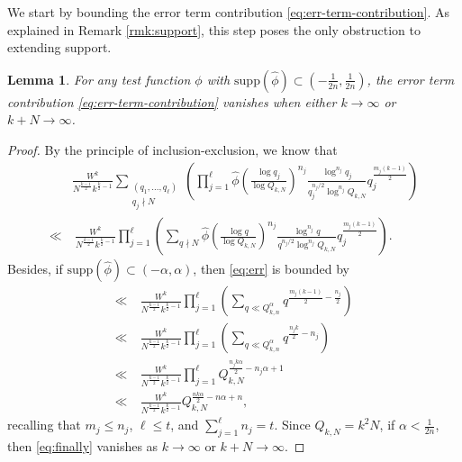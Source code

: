 \documentclass[12pt, reqno,oneside]{amsart}
\theoremstyle{plain}
\newtheorem{lemma}[theorem]{Lemma}
\theoremstyle{definition}
\theoremstyle{remark}
\theoremstyle{plain}
\numberwithin{equation}{section}
\begin{document}
We start by bounding the error term contribution \eqref{eq:err-term-contribution}. As explained in Remark \ref{rmk:support}, this step poses the only obstruction to extending support.

\begin{lemma}\label{lemma:error-term-analysis}
For any test function $\phi$ with $\text{supp}(\widehat{\phi})\subset\left(-\frac{1}{2n},\frac{1}{2n}\right)$, the error term contribution \eqref{eq:err-term-contribution} vanishes when either $k\to\infty$ or $k+N\to\infty$.
\end{lemma}
\begin{proof}
By the principle of inclusion-exclusion, we know that 
\begin{align}
\nonumber
&\frac{W^k}{N^{\frac{k-1}{2}}k^{\frac{k}{2}-1}}\sum_{\substack{(q_1,\dots,q_\ell) \\ q_j\nmid N}}\left(\prod_{j=1}^\ell\widehat{\phi}\left(\frac{\log q_j}{\log Q_{k,N}}\right)^{n_j}\frac{\log^{n_j} q_j}{q_j^{n_j/2}\log^{n_j} Q_{k,N}} q_j^{\frac{m_j(k-1)}{2}}\right) \\
\label{eq:err}
\ll & \ \frac{W^k}{N^{\frac{k-1}{2}}k^{\frac{k}{2}-1}}\prod_{j=1}^\ell\left(\sum_{q\nmid N}\widehat{\phi}\left(\frac{\log q}{\log Q_{k,N}}\right)^{n_j}\frac{\log^{n_j} q}{q^{n_j/2}\log^{n_j} Q_{k,N}} q_j^{\frac{m_j(k-1)}{2}}\right).
\end{align}
Besides, if $\text{supp}(\widehat{\phi})\subset(-\alpha,\alpha)$, then \eqref{eq:err} is bounded by 
\begin{align}
\nonumber
\ll & \ \frac{W^k}{N^{\frac{k-1}{2}}k^{\frac{k}{2}-1}}\prod_{j=1}^\ell\left(\sum_{q\ll Q_{k,n}^\alpha}q^{\frac{m_j(k-1)}{2}-\frac{n_j}{2}}\right) \\
\nonumber
\ll & \ \frac{W^k}{N^{\frac{k-1}{2}}k^{\frac{k}{2}-1}}\prod_{j=1}^\ell\left(\sum_{q\ll Q_{k,n}^\alpha}q^{\frac{n_jk}{2}-n_j}\right) \\
\nonumber
\ll & \ \frac{W^k}{N^{\frac{k-1}{2}}k^{\frac{k}{2}-1}}\prod_{j=1}^\ell Q_{k,N}^{\frac{n_jk\alpha}{2}-n_j\alpha+1}\\
\label{eq:finally}
\ll & \ \frac{W^k}{N^{\frac{k-1}{2}}k^{\frac{k}{2}-1}}Q_{k,N}^{\frac{nk\alpha}{2}-n\alpha+n},
\end{align}
recalling that $m_j\leq n_j$, $\ell\leq t$, and $\sum_{j=1}^\ell n_j=t$.
Since $Q_{k,N}=k^2N$, if $\alpha<\frac{1}{2n}$, then \eqref{eq:finally} vanishes as $k\to\infty$ or $k+N\to\infty$.
\end{proof}
\end{document}
